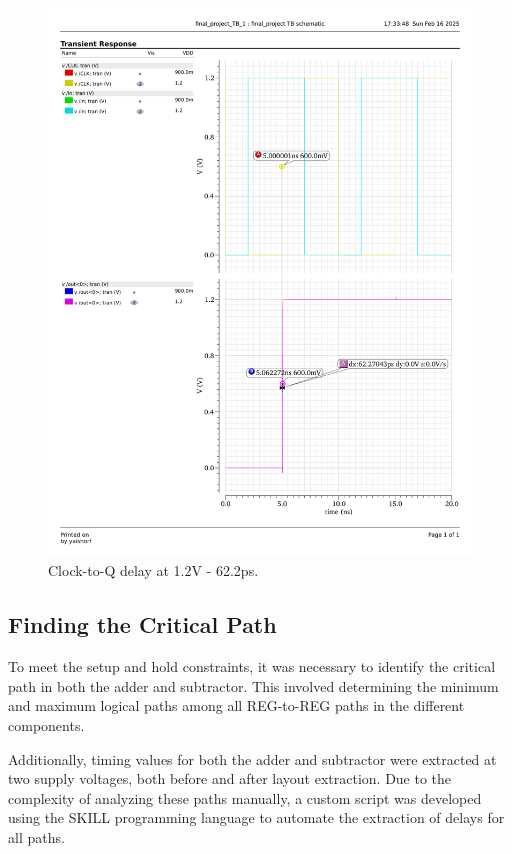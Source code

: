 \documentclass[a4paper,12pt]{article}
\begin{document}
\begin{figure}[H]
\begin{minipage}{0.49\textwidth}
        \includegraphics[width=\textwidth]{graphs/CQ_1.2_62.2p.pdf}
        \caption{Clock-to-Q delay at 1.2V - 62.2ps.}
    \end{minipage}
\end{figure}
\subsection{Finding the Critical Path}
To meet the setup and hold constraints, it was necessary to identify the critical path in both the adder and subtractor. This involved determining the minimum and maximum logical paths among all REG-to-REG paths in the different components.

Additionally, timing values for both the adder and subtractor were extracted at two supply voltages, both before and after layout extraction. Due to the complexity of analyzing these paths manually, a custom script was developed using the SKILL programming language to automate the extraction of delays for all paths. 
\end{document}
